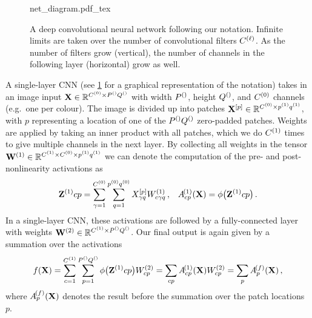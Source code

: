 \documentclass[tablecaption=bottom,wcp,nonatbib]{jmlr} %
\newcommand{\vX}{\mathbf{X}}
\newcommand{\vZ}{\mathbf{Z}}
\begin{document}
\begin{figure}[b]
  \centering
{\renewcommand{\layerAs}[1]{\vZ^{(#1)}}
  {net_diagram.pdf_tex}}
  \caption{A deep convolutional neural network following our notation. Infinite limits are taken over the number of convolutional filters $C^{(\ell)}$. As the number of filters grow (vertical), the number of channels in the following layer (horizontal) grow as well.}
  \label{fig:fancy-cnn}
\end{figure}

\newcommand{\convpatch}[2]{{#1}^{[#2]}}
A single-layer CNN (see \cref{fig:fancy-cnn} for a graphical representation of the notation) takes in an image input $\vX \in \Reals^{\layerC{0}\times \layersize{}}$ with width $P^{()}$, height $Q^{()}$, and $C^{(0)}$ channels (e.g.~one per colour). The image is divided up into patches $\convpatch{\vX}{p} \in \Reals^{\layerC{0}\times\patchw{1}\patchh{1}}$, with $p$ representing a location of one of the $P^{()}Q^{()}$ zero-padded patches. Weights are applied by taking an inner product with all patches, which we do $C^{(1)}$ times to give multiple channels in the next layer. By collecting all weights in the tensor $\mathbf{W}^{(1)}\in\mathbb{R}^{C^{(1)}\times C^{(0)}\times p^{(1)}q^{(1)}}$ we can denote the computation of the pre- and post-nonlinearity activations as
\begin{align}
    \layerAs{1}{cp} = \sum_{\gamma=1}^{\layerC0}\sum_{q=1}^{\patchw0\patchh0} \convpatch{X}{p}_{\gamma q} \layerWs1_{c\gamma q} \,, && \layerNLAs{(1)}{cp} = \phi\big(\layerAs{1}{cp}\big)\,.
\end{align}
In a single-layer CNN, these activations are followed by a fully-connected layer with weights $\mathbf{W}^{(2)} \in \mathbb{R}^{C^{(1)}\times P^{()}Q^{()}}$. Our final output is again given by a summation over the activations
\begin{align}
    f(\vX) = \sum_{c=1}^{\layerC1}\sum_{p=1}^{\layersize{}} \phi\big(\layerAs{1}{cp}\big) W^{(2)}_{cp} = \sum_{cp} \layerNLAs{(1)}{cp}\layerWs{2}_{cp} = \sum_p \layerNLAs{(f)}{p} \label{eq:single-layer-f} \,,
\end{align}
where $\layerNLAs{(f)}{p}$ denotes the result before the summation over the patch locations $p$. 
\end{document}
